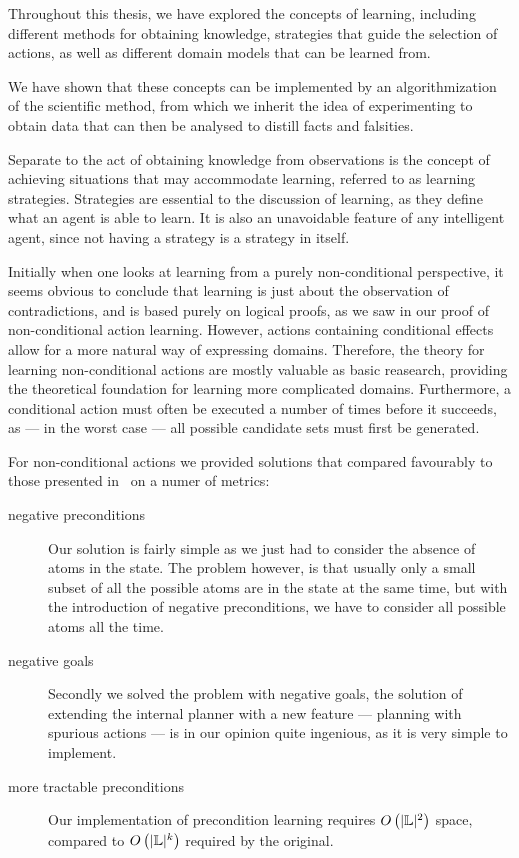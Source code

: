 \documentclass[Master.tex]{subfiles}
\begin{document}
Throughout this thesis, we have explored the concepts of learning, including different methods for obtaining knowledge, strategies that guide the selection of actions, as well as different domain models that can be learned from.

We have shown that these concepts can be implemented by an algorithmization of the scientific method, from which we inherit the idea of experimenting to obtain data that can then be analysed to distill facts and falsities.

	Separate to the act of obtaining knowledge from observations is the concept of achieving situations that may accommodate learning, referred to as learning strategies.
	Strategies are essential to the discussion of learning, as they define what an agent is able to learn.
	It is also an unavoidable feature of any intelligent agent, since not having a strategy is a strategy in itself. 

	Initially when one looks at learning from a purely non-conditional perspective, 
	it seems obvious to conclude that learning is just about the observation of contradictions,
	and is based purely on logical proofs, as we saw in our proof of non-conditional action learning.
    However, actions containing conditional effects allow for a more natural way of expressing domains. Therefore, the theory for learning non-conditional actions are mostly valuable as basic reasearch, providing the theoretical foundation for learning more complicated domains.
	Furthermore, a conditional action must often be executed a number of times before it succeeds, as --- in the worst case --- all possible candidate sets must first be generated.
	
    For non-conditional actions we provided solutions that compared favourably to those presented in~\cite{Walsh2008} on a numer of metrics: 

\begin{description}
    \item[negative preconditions] Our solution is fairly simple as we just had to consider the absence of atoms in the state. The problem however, is that usually only a small subset of all the possible atoms are in the state at the same time, but with the introduction of negative preconditions, we have to consider all possible atoms all the time.
    \item[negative goals] Secondly we solved the problem with negative goals, the solution of extending the internal planner with a new feature --- planning with spurious actions --- is in our opinion quite ingenious, as it is very simple to implement. 
    \item[more tractable preconditions] Our implementation of precondition learning requires $O\left(|\mathbb{L}|^2 \right)$ space, compared to $O\left(|\mathbb{L}|^k\right)$ required by the original.
\end{description}
	
\end{document}
